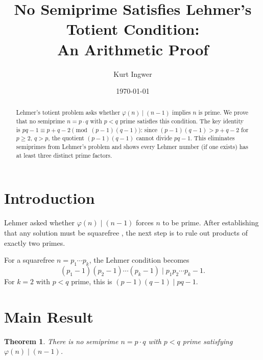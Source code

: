 \documentclass[12pt,a4paper]{amsart}
\newtheorem{theorem}{Theorem}[section]
\theoremstyle{definition}
\newcommand{\euler}{\varphi}
\begin{document}

\title{No Semiprime Satisfies Lehmer's Totient Condition:\\ An Arithmetic Proof}

\author{Kurt Ingwer}
\address{Specialist Mathematics Project, Version Build 44}
\date{\today}

\begin{abstract}
Lehmer's totient problem asks whether $\euler(n) \mid (n-1)$ implies $n$ is prime.
We prove that no semiprime $n = p \cdot q$ with $p < q$ prime satisfies this condition.
The key identity is $pq - 1 \equiv p + q - 2 \pmod{(p-1)(q-1)}$: since $(p-1)(q-1) > p + q - 2$
for $p \ge 2$, $q > p$, the quotient $(p-1)(q-1)$ cannot divide $pq - 1$.
This eliminates semiprimes from Lehmer's problem and shows every Lehmer number
(if one exists) has at least three distinct prime factors.
\end{abstract}

\maketitle

\section{Introduction}

Lehmer \cite{Lehmer1932} asked whether $\euler(n) \mid (n-1)$ forces $n$ to be prime.
After establishing that any solution must be squarefree \cite{Ingwer2026sqfree},
the next step is to rule out products of exactly two primes.

For a squarefree $n = p_1 \cdots p_k$, the Lehmer condition becomes
\[
  (p_1-1)(p_2-1)\cdots(p_k-1) \mid p_1 p_2 \cdots p_k - 1.
\]
For $k = 2$ with $p < q$ prime, this is $(p-1)(q-1) \mid pq - 1$.

\section{Main Result}

\begin{theorem}
\label{thm:nosemi}
There is no semiprime $n = p \cdot q$ with $p < q$ prime satisfying
$\euler(n) \mid (n-1)$.
\end{theorem}
\end{document}
